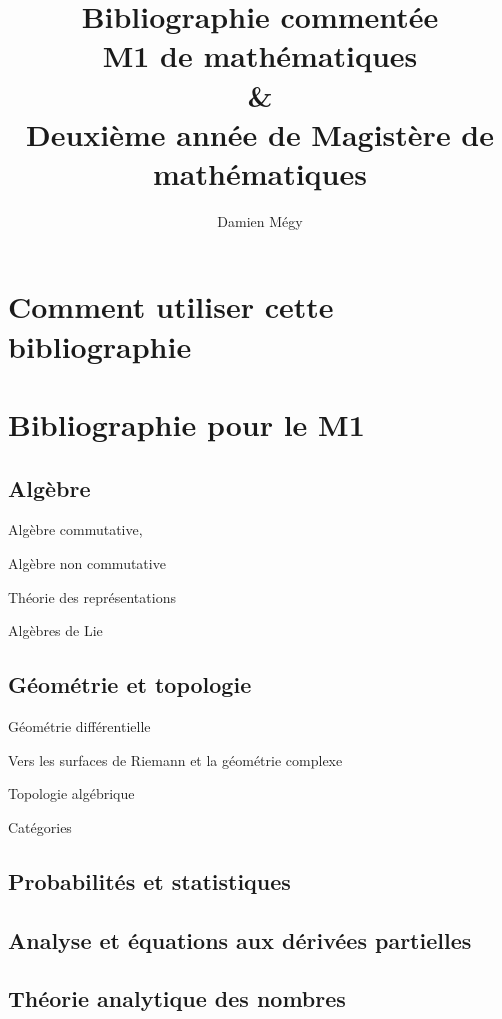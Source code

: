 \documentclass{article}
\begin{document}
\author{Damien Mégy}
\title{Bibliographie commentée\\M1 de mathématiques \\ \&\\ Deuxième année de Magistère de mathématiques}

\maketitle
\tableofcontents


\section*{Comment utiliser cette bibliographie}

\newpage
\section{Bibliographie pour le M1}

\subsection{Algèbre}

Algèbre commutative,

Algèbre non commutative

Théorie des représentations

Algèbres de Lie



\subsection{Géométrie et topologie}

Géométrie différentielle

Vers les surfaces de Riemann et la géométrie complexe

Topologie algébrique

Catégories



\subsection{Probabilités et statistiques}

\subsection{Analyse et équations aux dérivées partielles}

\subsection{Théorie analytique des nombres}
\end{document}
